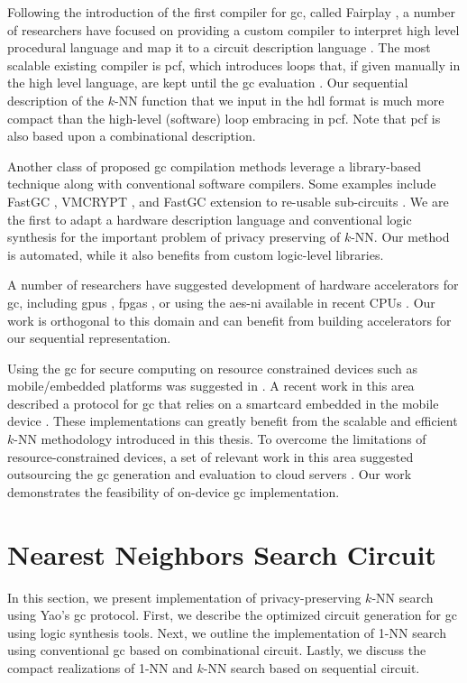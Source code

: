 Following the introduction of the first compiler for \acrshort{gc}, called Fairplay \cite{malkhi2004fairplay}, a number of researchers have focused on providing a custom compiler to interpret high level procedural language and map it to a circuit description language \cite{henecka2010tasty,holzer2012secure}.
The most scalable existing compiler is \gls{pcf}, which introduces loops that, if given manually in the high level language, are kept until the \acrshort{gc} evaluation \cite{kreuter2013pcf}.
Our sequential description of the $k$-NN function that we input in the \acrshort{hdl} format is much more compact than the high-level (software) loop embracing in \gls{pcf}.
Note that \gls{pcf} is also based upon a combinational description.

Another class of proposed \acrshort{gc} compilation methods leverage a library-based technique along with conventional software compilers.
Some examples include FastGC \cite{huang2011faster}, VMCRYPT \cite{malka2011vmcrypt}, and FastGC extension to re-usable sub-circuits \cite{henecka2013faster}.
We are the first to adapt a hardware description language and conventional logic synthesis for the important problem of privacy preserving of $k$-NN.
Our method is automated, while it also benefits from custom logic-level libraries.

A number of researchers have suggested development of hardware accelerators for \acrshort{gc}, including \acrshort{gpu}s \cite{husted2013gpu,pu2013computing}, \acrshort{fpga}s \cite{jarvinen2010garbled}, or using the \acrshort{aes-ni} available in recent CPUs \cite{bellare2013efficient}.
Our work is orthogonal to this domain and can benefit from building accelerators for our sequential representation.

Using the \acrshort{gc} for secure computing on resource constrained devices such as mobile/embedded platforms was suggested in \cite{huang2011privacy}.
A recent work in this area described a protocol for \acrshort{gc} that relies on a smartcard embedded in the mobile device \cite{demmler2014ad}.
These implementations can greatly benefit from the scalable and efficient $k$-NN methodology introduced in this thesis.
To overcome the limitations of resource-constrained devices, a set of relevant work in this area suggested outsourcing the \acrshort{gc} generation and evaluation to cloud servers \cite{carter2016secure,carter2014whitewash}.
Our work demonstrates the feasibility of on-device \acrshort{gc} implementation.

\section{Nearest Neighbors Search Circuit}\label{sec:knn-circuit}
In this section, we present implementation of privacy-preserving $k$-NN search using Yao's \acrshort{gc} protocol.
First, we describe the optimized circuit generation for \acrshort{gc} using logic synthesis tools.
Next, we outline the implementation of 1-NN search using conventional \acrshort{gc} based on combinational circuit.
Lastly, we discuss the compact realizations of 1-NN and $k$-NN search based on sequential circuit.

